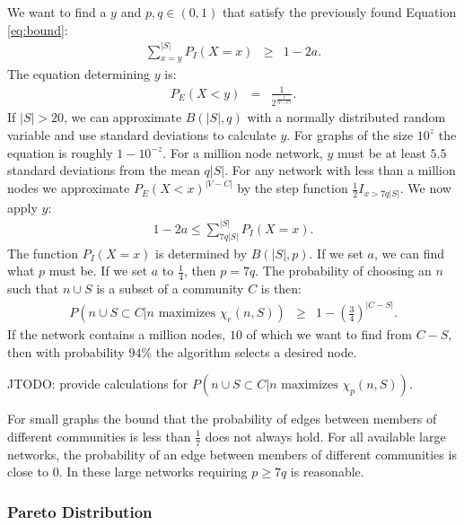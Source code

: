 \documentclass[phd,tocprelim]{cornell}
\begin{document}
We want to find a $y$ and $p,q \in (0, 1)$ that satisfy the previously found Equation \ref{eq:bound}:
\begin{eqnarray*}
\sum\limits_{x=y}^{|S|} P_I(X = x) &\geq& 1 - 2a.
\end{eqnarray*}
The equation determining $y$ is:
\begin{eqnarray*}
P_E(X < y)&=& \frac{1}{2^{\frac{1}{|V-C|}}} .
\end{eqnarray*}
 If $|S| > 20$, we can approximate $B(|S|, q)$ with a normally distributed random variable and use standard deviations to calculate $y$.  For graphs of the size $10^z$ the equation is roughly $1 - 10^{-z}$.  For a million node network, $y$ must be at least $5.5$ standard deviations from the mean $q|S|$.  For any network with less than a million nodes we approximate $P_E(X<x)^{|V-C|}$ by the step function $\frac{1}{2} I_{x > 7q|S|}$.  We now apply $y$:
\begin{eqnarray*}
1 - 2a \leq   \sum\limits_{7q|S|}^{|S|} P_I(X = x) .
\end{eqnarray*}
The function $P_I(X=x)$ is determined by $B(|S|, p)$.  If we set $a$, we can find what $p$ must be.  If we set $a$ to $\frac{1}{4}$, then $p = 7 q$.  The probability of choosing an $n$ such that $n \cup S$ is a subset of a 
community $C$ is then:
\begin{eqnarray*}
P(n \cup S \subset C | n \mbox{ maximizes } \chi_e(n, S)) &\geq& 1 - \left( \frac{3}{4}  \right)^{|C - S|}.
\end{eqnarray*}
If the network contains a million nodes, $10$ of which we want to find from $C-S$, then with probability $94\%$ the algorithm selects a desired node.

JTODO: provide calculations for $P(n \cup S \subset C | n \mbox{ maximizes } \chi_p(n, S))$.

For small graphs the bound that the probability of edges between members of different communities is less than $\frac{1}{7}$ does not always hold.  For all available large networks, the probability of an edge between members of different communities is close to $0$.  In these large networks requiring $p \geq 7q$ is reasonable.

\subsubsection{Pareto Distribution}
\end{document}
